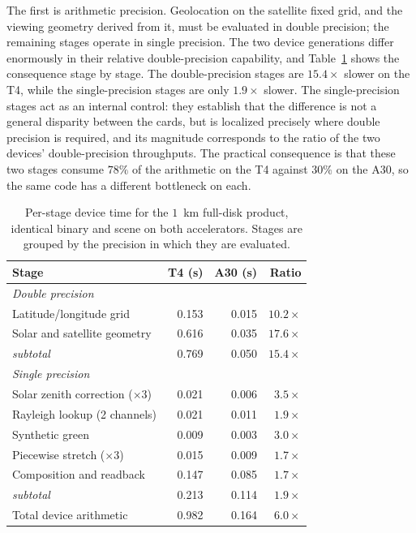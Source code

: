 \documentclass[11pt]{article}
\begin{document}
The first is arithmetic precision. Geolocation on the satellite fixed grid, and
the viewing geometry derived from it, must be evaluated in double precision;
the remaining stages operate in single precision. The two device generations
differ enormously in their relative double-precision capability, and
Table~\ref{tab:stages} shows the consequence stage by stage. The
double-precision stages are $15.4\times$ slower on the T4, while the
single-precision stages are only $1.9\times$ slower. The single-precision
stages act as an internal control: they establish that the difference is not a
general disparity between the cards, but is localized precisely where double
precision is required, and its magnitude corresponds to the ratio of the two
devices' double-precision throughputs. The practical consequence is that these
two stages consume $78\%$ of the arithmetic on the T4 against $30\%$ on the
A30, so the same code has a different bottleneck on each.

\begin{table}[t]
\caption{Per-stage device time for the $1$~km full-disk product, identical
binary and scene on both accelerators. Stages are grouped by the precision in
which they are evaluated.}\label{tab:stages}
\centering
\begin{tabular}{lrrr}
\toprule
Stage & T4 (s) & A30 (s) & Ratio \\
\midrule
\multicolumn{4}{l}{\textit{Double precision}} \\
\quad Latitude/longitude grid       & 0.153 & 0.015 & $10.2\times$ \\
\quad Solar and satellite geometry  & 0.616 & 0.035 & $17.6\times$ \\
\quad \textit{subtotal}             & 0.769 & 0.050 & $15.4\times$ \\
\midrule
\multicolumn{4}{l}{\textit{Single precision}} \\
\quad Solar zenith correction ($\times 3$) & 0.021 & 0.006 & $3.5\times$ \\
\quad Rayleigh lookup (2 channels)  & 0.021 & 0.011 & $1.9\times$ \\
\quad Synthetic green               & 0.009 & 0.003 & $3.0\times$ \\
\quad Piecewise stretch ($\times 3$) & 0.015 & 0.009 & $1.7\times$ \\
\quad Composition and readback      & 0.147 & 0.085 & $1.7\times$ \\
\quad \textit{subtotal}             & 0.213 & 0.114 & $1.9\times$ \\
\midrule
Total device arithmetic             & 0.982 & 0.164 & $6.0\times$ \\
\bottomrule
\end{tabular}
\end{table}
\end{document}
